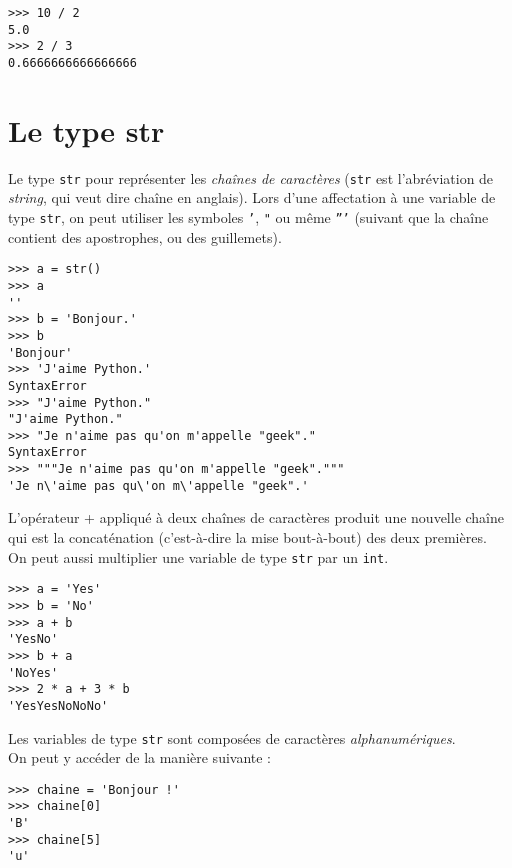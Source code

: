 \begin{pyc}\begin{verbatim}
>>> 10 / 2
5.0
>>> 2 / 3
0.6666666666666666
\end{verbatim}
\end{pyc}


\section{Le type str}

Le type \texttt{str} pour représenter les \textit{chaînes de caractères} (\texttt{str} est l'abréviation de \emph{string}, qui veut dire chaîne en anglais).
Lors d'une affectation à une variable de type \texttt{str}, on peut utiliser les symboles \texttt{'}, \texttt{"} ou même \texttt{'''} (suivant que la chaîne contient
des apostrophes, ou des guillemets).

\begin{pyc}\begin{verbatim}
>>> a = str()
>>> a
''
>>> b = 'Bonjour.'
>>> b
'Bonjour'
>>> 'J'aime Python.'
SyntaxError
>>> "J'aime Python."
"J'aime Python."
>>> "Je n'aime pas qu'on m'appelle "geek"."
SyntaxError
>>> """Je n'aime pas qu'on m'appelle "geek"."""
'Je n\'aime pas qu\'on m\'appelle "geek".'
\end{verbatim}
\end{pyc}

L'opérateur + appliqué à deux chaînes de caractères produit une nouvelle chaîne qui est la concaténation (c'est-à-dire la mise bout-à-bout) des deux premières.\\

On peut aussi multiplier une variable de type \texttt{str} par un \texttt{int}.\\

\begin{pyc}\begin{verbatim}
>>> a = 'Yes'
>>> b = 'No'
>>> a + b
'YesNo'
>>> b + a
'NoYes'
>>> 2 * a + 3 * b
'YesYesNoNoNo'
\end{verbatim}
\end{pyc}

Les variables de type \texttt{str} sont composées de caractères \emph{alphanumériques}.\\ On peut y accéder de la manière suivante :

\begin{pyc}\begin{verbatim}
>>> chaine = 'Bonjour !'
>>> chaine[0]
'B'
>>> chaine[5]
'u'
\end{verbatim}
\end{pyc}

